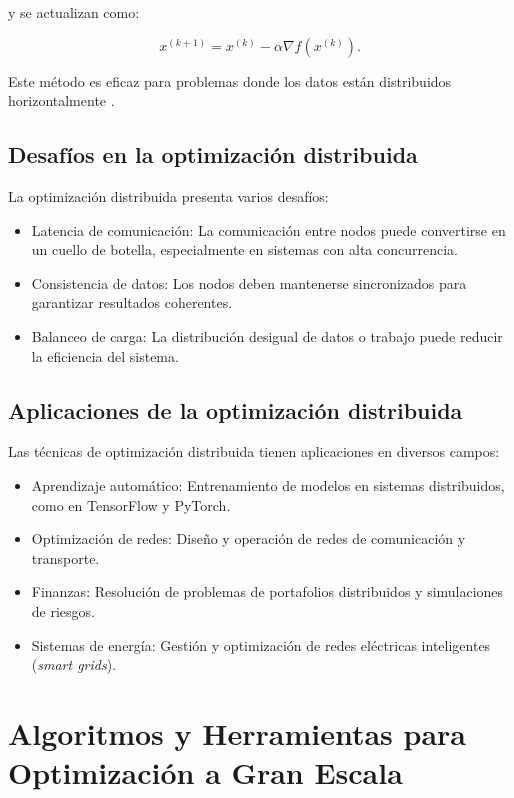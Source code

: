 \begin{itemize}
		y se actualizan como:
		
		\begin{equation}
			x^{(k+1)} = x^{(k)} - \alpha \nabla f(x^{(k)}).
		\end{equation}
		
		Este método es eficaz para problemas donde los datos están distribuidos horizontalmente \cite{recht2011hogwild}.
		
		\subsection{Desafíos en la optimización distribuida}
		
		La optimización distribuida presenta varios desafíos:
		
		\begin{itemize}
			\item Latencia de comunicación: La comunicación entre nodos puede convertirse en un cuello de botella, especialmente en sistemas con alta concurrencia.
			\item Consistencia de datos: Los nodos deben mantenerse sincronizados para garantizar resultados coherentes.
			\item Balanceo de carga: La distribución desigual de datos o trabajo puede reducir la eficiencia del sistema.
		\end{itemize}
		
		\subsection{Aplicaciones de la optimización distribuida}
		
		Las técnicas de optimización distribuida tienen aplicaciones en diversos campos:
		
		\begin{itemize}
			\item Aprendizaje automático: Entrenamiento de modelos en sistemas distribuidos, como en TensorFlow y PyTorch.
			\item Optimización de redes: Diseño y operación de redes de comunicación y transporte.
			\item Finanzas: Resolución de problemas de portafolios distribuidos y simulaciones de riesgos.
			\item Sistemas de energía: Gestión y optimización de redes eléctricas inteligentes (\textit{smart grids}).
		\end{itemize}
		
		\section{Algoritmos y Herramientas para Optimización a Gran Escala}
		

\end{itemize}
